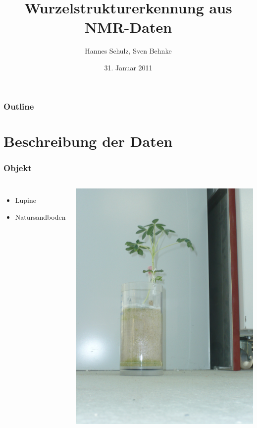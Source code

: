 \documentclass[final,ngerman,ignorenonframetext,compress]{beamer}
\title{Wurzelstrukturerkennung aus NMR-Daten}
\author{Hannes Schulz, Sven Behnke}
\institute[Uni Bonn, Germany]%
{\texttt{[image: Logo\_UBo\_h24\_4c-crop]}}
\date{31. Januar 2011}
\begin{document}
\begin{frame}[plain]
  \titlepage%
\end{frame}


\begin{frame}[plain] %
  \frametitle{Outline}
    \tableofcontents[hidesubsections]
\end{frame}

\section{Beschreibung der Daten}

\begin{frame}
	\frametitle{Objekt}
	\begin{columns}
		\begin{itemize}
			\item Lupine
			\item Natursandboden
		\end{itemize}
		\includegraphics[width=\linewidth]{img/o}
	\end{columns}
\end{frame}
\end{document}
